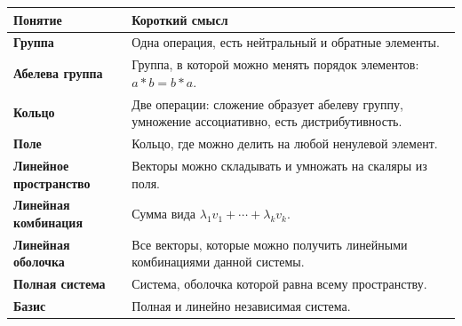 \begin{center}
\begin{tabularx}{0.98\textwidth}{>{\bfseries}p{}X}
\toprule
Понятие & Короткий смысл \\
\midrule
Группа & Одна операция, есть нейтральный и обратные элементы. \\
Абелева группа & Группа, в которой можно менять порядок элементов: $a*b=b*a$. \\
Кольцо & Две операции: сложение образует абелеву группу, умножение ассоциативно, есть дистрибутивность. \\
Поле & Кольцо, где можно делить на любой ненулевой элемент. \\
Линейное пространство & Векторы можно складывать и умножать на скаляры из поля. \\
Линейная комбинация & Сумма вида $\lambda_1v_1+\cdots+\lambda_kv_k$. \\
Линейная оболочка & Все векторы, которые можно получить линейными комбинациями данной системы. \\
Полная система & Система, оболочка которой равна всему пространству. \\
Базис & Полная и линейно независимая система. \\
\bottomrule
\end{tabularx}
\end{center}
